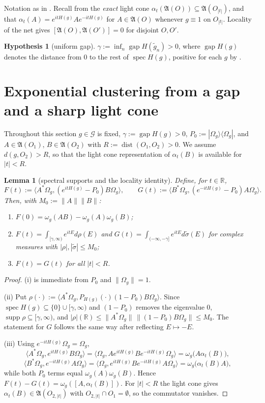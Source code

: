 \documentclass[11pt,a4paper]{article}
\theoremstyle{plain}
\newtheorem{lemma}[theorem]{Lemma}
\theoremstyle{definition}
\newtheorem{hypothesis}[theorem]{Hypothesis}
\newcommand{\A}{\mathfrak{A}}
\newcommand{\G}{\mathcal{G}}
\newcommand{\R}{\mathbb{R}}
\newcommand{\Om}{\Omega}
\newcommand{\ip}[2]{\langle #1,#2\rangle}
\DeclareMathOperator{\dist}{dist}
\DeclareMathOperator{\supp}{supp}
\DeclareMathOperator{\spec}{spec}
\DeclareMathOperator{\gapop}{gap}
\begin{document}
Notation as in \cite{M0,M1}. Recall from \cite[Fact~1.3]{M0} the \emph{exact} light cone
$\alpha_t(\A(O))\subseteq\A(O_{|t|})$, and that $\alpha_t(A)=e^{itH(g)}Ae^{-itH(g)}$ for
$A\in\A(O)$ whenever $g\equiv1$ on $O_{|t|}$. Locality of the net gives $[\A(O),\A(O')]=0$ for
disjoint $O,O'$.

\begin{hypothesis}[uniform gap]\label{hyp:gap}
$\gamma:=\inf_n\gapop H(\tilde g_n)>0$, where $\gapop H(g)$ denotes the distance from $0$ to the
rest of $\spec H(g)$, positive for each $g$ by \cite[\S2.2--2.3]{GJII}.
\end{hypothesis}

\section{Exponential clustering from a gap and a sharp light cone}\label{sec:clust}

Throughout this section $g\in\G$ is fixed, $\gamma:=\gapop H(g)>0$,
$P_0:=|\Om_g\rangle\langle\Om_g|$, and $A\in\A(O_1)$, $B\in\A(O_2)$ with
$R:=\dist(O_1,O_2)>0$. We assume $d(g,O_2)>R$, so that the light cone representation of
$\alpha_t(B)$ is available for $|t|<R$.

\begin{lemma}[spectral supports and the locality identity]\label{lem:FG}
Define, for $t\in\R$,
\[
  F(t):=\ip{A^*\Om_g}{(e^{itH(g)}-P_0)B\Om_g},\qquad
  G(t):=\ip{B^*\Om_g}{(e^{-itH(g)}-P_0)A\Om_g}.
\]
Then, with $M_0:=\|A\|\|B\|$:
\begin{enumerate}
\item[\rm(i)] $F(0)=\omega_g(AB)-\omega_g(A)\omega_g(B)$;
\item[\rm(ii)] $F(t)=\int_{[\gamma,\infty)}e^{itE}d\rho(E)$ and
      $G(t)=\int_{(-\infty,-\gamma]}e^{itE}d\tilde\sigma(E)$ for complex measures with
      $|\rho|,|\tilde\sigma|\le M_0$;
\item[\rm(iii)] $F(t)=G(t)$ for all $|t|<R$.
\end{enumerate}
\end{lemma}

\begin{proof}
(i) is immediate from $P_0$ and $\|\Om_g\|=1$.

(ii) Put $\rho(\cdot):=\ip{A^*\Om_g}{P_{H(g)}(\cdot)(1-P_0)B\Om_g}$. Since
$\spec H(g)\subseteq\{0\}\cup[\gamma,\infty)$ and $(1-P_0)$ removes the eigenvalue $0$,
$\supp\rho\subseteq[\gamma,\infty)$, and
$|\rho|(\R)\le\|A^*\Om_g\|\,\|(1-P_0)B\Om_g\|\le M_0$. The statement for $G$ follows the same way
after reflecting $E\mapsto-E$.

(iii) Using $e^{-itH(g)}\Om_g=\Om_g$,
\[
  \ip{A^*\Om_g}{e^{itH(g)}B\Om_g}=\ip{\Om_g}{Ae^{itH(g)}Be^{-itH(g)}\Om_g}=\omega_g\bigl(A\alpha_t(B)\bigr),
\]
\[
  \ip{B^*\Om_g}{e^{-itH(g)}A\Om_g}=\ip{\Om_g}{e^{itH(g)}Be^{-itH(g)}A\Om_g}=\omega_g\bigl(\alpha_t(B)A\bigr),
\]
while both $P_0$ terms equal $\omega_g(A)\omega_g(B)$. Hence
$F(t)-G(t)=\omega_g([A,\alpha_t(B)])$. For $|t|<R$ the light cone gives
$\alpha_t(B)\in\A(O_{2,|t|})$ with $O_{2,|t|}\cap O_1=\emptyset$, so the commutator vanishes.
\end{proof}
\end{document}
